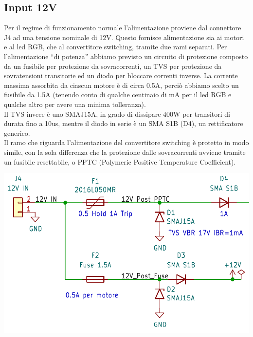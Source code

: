 \hypertarget{input-12V}{%
\subsection{\texorpdfstring{Input 12V}{Input 12V}}\label{input-12V}}

Per il regime di funzionamento normale l’alimentazione proviene dal connettore J4 ad una tensione nominale di 12V. 
Questo fornisce alimentazione sia ai motori e al led RGB, che al convertitore switching, tramite due rami separati.
Per l’alimentazione “di potenza” abbiamo previsto un circuito di protezione composto da un fusibile per protezione da sovracorrenti, 
un TVS per protezione da sovratensioni transitorie ed un diodo per bloccare correnti inverse. La corrente massima assorbita da 
ciascun motore è di circa 0.5A, perciò abbiamo scelto un fusibile da 1.5A (tenendo conto di qualche centinaio di mA per il led RGB 
e qualche altro per avere una minima tolleranza).\\
Il TVS invece è uno SMAJ15A, in grado di dissipare 400W per transitori di durata fino a 10us, mentre il diodo in serie è un SMA S1B 
(D4), un rettificatore generico.\\
Il ramo che riguarda l’alimentazione del convertitore switching è protetto in modo simile, con la sola differenza che la protezione 
dalle sovracorrenti avviene tramite un fusibile resettabile, o PPTC (Polymeric Positive Temperature Coefficient).

\begin{center}
\includegraphics[scale=0.5]{figures/image105.png}
\captionsetup{type=figure}
\end{center}

